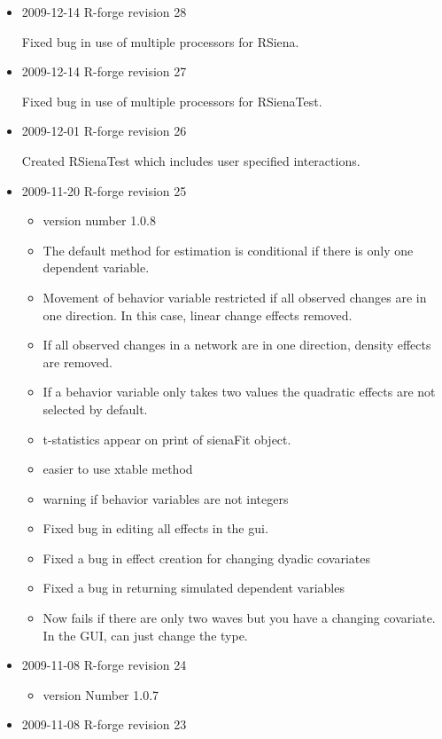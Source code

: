 \documentclass[a4paper,fleqn]{article}
\newcommand{\+}{\, + \,}
\newcommand{\sfn}[1]{\textsf{#1}}
\begin{document}
{\begin{itemize}
Fixed bug in 3-way interactions in RSienaTest

\item 2009-12-14 R-forge revision 28

 Fixed bug in use of multiple processors for RSiena.

\item 2009-12-14 R-forge revision 27

Fixed bug in use of multiple processors for
  RSienaTest.

\item 2009-12-01 R-forge revision 26

Created RSienaTest which includes user
  specified interactions.

\item 2009-11-20 R-forge revision 25

  \begin{itemize}
  \item  version number 1.0.8
  \item The default method for estimation is conditional if there is only one
    dependent variable.
  \item Movement of behavior variable restricted if all observed changes are in
    one direction. In this case, linear change effects removed.
  \item If all observed changes in a network are in one direction, density
    effects are removed.
  \item If a behavior variable only takes two values the quadratic effects
    are not selected by default.
  \item t-statistics appear on print of \sfn{sienaFit} object.
  \item easier to use \sfn{xtable} method
  \item warning if behavior variables are not integers
  \item Fixed bug in editing all effects in the gui.
  \item Fixed a bug in effect creation for changing dyadic covariates
  \item Fixed a bug in returning simulated dependent variables
  \item Now fails if there are only two waves but you have a changing
    covariate. In the GUI, can just change the type.
  \end{itemize}

\item 2009-11-08 R-forge revision 24

  \begin{itemize}
  \item
    version Number 1.0.7
  \end{itemize}
\item  2009-11-08 R-forge revision 23


\end{itemize}}
\end{document}
